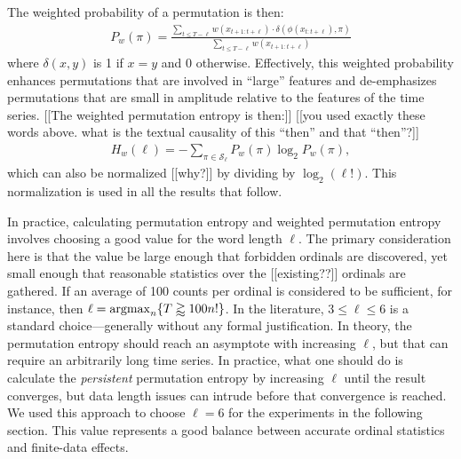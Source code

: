 The weighted probability of a permutation is then:
\begin{align*}
  P_w(\pi) = \frac{\displaystyle \sum_{t \le T - \ell} w(x_{t+1:t+\ell}) \cdot \delta(\phi(x_{t:t+\ell}), \pi) }{\displaystyle \sum_{t \le T - \ell} w(x_{t+1:t+\ell})}
\end{align*}
where $\delta(x, y)$ is 1 if $x = y$ and 0 otherwise. Effectively,
this weighted probability enhances permutations that are involved in
``large'' features and de-emphasizes permutations that are small in
amplitude relative to the features of the time series.  {\color{red}
  [[The weighted permutation entropy is then:]] [[you used exactly
      these words above.  what is the textual causality of this
      ``then'' and that ``then''?]]}
\begin{align*}
  H_w(\ell) = - \sum_{\pi \in \mathcal{S}_\ell} P_w(\pi) \log_2 P_w(\pi),
\end{align*}
which can also be normalized {\color{red} [[why?]]}  by dividing by
$\log_2(\ell!)$.  This normalization is used in all the results that
follow.

In practice, calculating permutation entropy and weighted permutation
entropy involves choosing a good value for the word length $\ell$. The
primary consideration here is that the value be large enough that
forbidden ordinals are discovered, yet small enough that reasonable
statistics over the {\color{red} [[existing??]]}  ordinals are
gathered.  If an average of 100 counts per ordinal is considered to be
sufficient, for instance, then $\ell =
\operatornamewithlimits{argmax}_n \{ T \gtrapprox 100 n! \}$.  In the
literature, $3 \le \ell \le 6$ is a standard choice---generally
without any formal justification.  In theory, the permutation entropy
should reach an asymptote with increasing $\ell$, but that can require
an arbitrarily long time series. In practice, what one should do is
calculate the \emph{persistent} permutation entropy by increasing
$\ell$ until the result converges, but data length issues can intrude
before that convergence is reached.  We used this approach to choose
$\ell = 6$ for the experiments in the following section.  This value
represents a good balance between accurate ordinal statistics and
finite-data effects.



